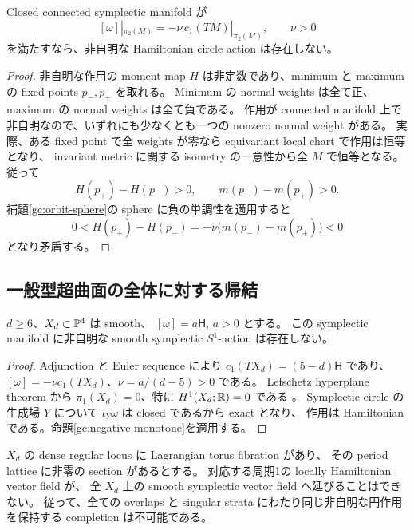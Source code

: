 \begin{proposition}
\label{gc:negative-monotone}
Closed connected symplectic manifold が
\[
 [\omega]|_{\pi_2(M)}=-\nu\,c_1(TM)|_{\pi_2(M)},\qquad \nu>0
\]
を満たすなら、非自明な Hamiltonian circle action は存在しない。
\end{proposition}

\begin{proof}
非自明な作用の moment map $H$ は非定数であり、minimum と maximum の
fixed points $p_-,p_+$ を取れる。
Minimum の normal weights は全て正、maximum の normal weights は全て負である。
作用が connected manifold 上で非自明なので、いずれにも少なくとも一つの
nonzero normal weight がある。
実際、ある fixed point で全 weights が零なら equivariant local chart で作用は恒等となり、
invariant metric に関する isometry の一意性から全 $M$ で恒等となる。
従って
\[
 H(p_+)-H(p_-)>0,\qquad m(p_-)-m(p_+)>0.
\]
補題\ref{gc:orbit-sphere}の sphere に負の単調性を適用すると
\[
 0<H(p_+)-H(p_-)
   =-\nu\bigl(m(p_-)-m(p_+)\bigr)<0
\]
となり矛盾する。
\end{proof}

\subsection{一般型超曲面の全体に対する帰結}

\begin{corollary}
\label{gc:hypersurface}
$d\ge6$、$X_d\subset\mathbb P^4$ は smooth、
$[\omega]=a\mathsf H$, $a>0$ とする。
この symplectic manifold に非自明な smooth symplectic $S^1$-action は存在しない。
\end{corollary}

\begin{proof}
Adjunction と Euler sequence により
$c_1(TX_d)=(5-d)\mathsf H$ であり、
$[\omega]=-\nu c_1(TX_d)$、$\nu=a/(d-5)>0$ である。
Lefschetz hyperplane theorem から $\pi_1(X_d)=0$、特に
$H^1(X_d;\mathbb R)=0$ である
\cite[Corollary 2.3.4]{achinger-lefschetz-gc}。
Symplectic circle の生成場 $Y$ について $\iota_Y\omega$ は closed であるから exact となり、
作用は Hamiltonian である。命題\ref{gc:negative-monotone}を適用する。
\end{proof}

\begin{corollary}
\label{gc:period-lattice}
$X_d$ の dense regular locus に Lagrangian torus fibration があり、
その period lattice に非零の section があるとする。
対応する周期1の locally Hamiltonian vector field が、
全 $X_d$ 上の smooth symplectic vector field へ延びることはできない。
従って、全ての overlaps と singular strata にわたり同じ非自明な円作用を保持する
completion は不可能である。
\end{corollary}

